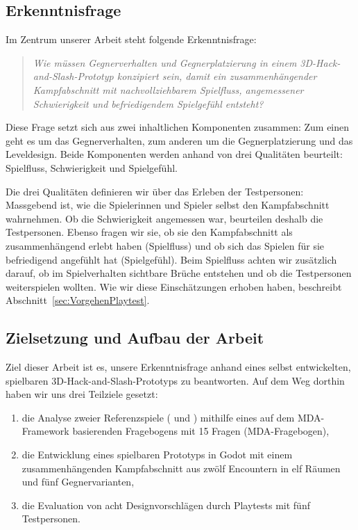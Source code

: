 \documentclass[../Main.tex]{subfiles}
\begin{document}
\subsection{Erkenntnisfrage} \label{sec:Erkenntnisfrage}

Im Zentrum unserer Arbeit steht folgende Erkenntnisfrage:

\vspace{\baselineskip}

\begin{quote}
    \textit{Wie müssen Gegnerverhalten und Gegnerplatzierung in einem 3D-Hack-and-Slash-Prototyp konzipiert sein, damit ein zusammenhängender Kampfabschnitt mit nachvollziehbarem Spielfluss, angemessener Schwierigkeit und befriedigendem Spielgefühl entsteht?}
\end{quote}

\vspace{\baselineskip}

Diese Frage setzt sich aus zwei inhaltlichen Komponenten zusammen: Zum einen geht es um das Gegnerverhalten, zum anderen um die Gegnerplatzierung und das Leveldesign. Beide Komponenten werden anhand von drei Qualitäten beurteilt: Spielfluss, Schwierigkeit und Spielgefühl.

Die drei Qualitäten definieren wir über das Erleben der Testpersonen: Massgebend ist, wie die Spielerinnen und Spieler selbst den Kampfabschnitt wahrnehmen. Ob die Schwierigkeit angemessen war, beurteilen deshalb die Testpersonen. Ebenso fragen wir sie, ob sie den Kampfabschnitt als zusammenhängend erlebt haben (Spielfluss) und ob sich das Spielen für sie befriedigend angefühlt hat (Spielgefühl). Beim Spielfluss achten wir zusätzlich darauf, ob im Spielverhalten sichtbare Brüche entstehen und ob die Testpersonen weiterspielen wollten. Wie wir diese Einschätzungen erhoben haben, beschreibt Abschnitt~\ref{sec:VorgehenPlaytest}.

\subsection{Zielsetzung und Aufbau der Arbeit} \label{sec:Aufbau}

Ziel dieser Arbeit ist es, unsere Erkenntnisfrage anhand eines selbst entwickelten, spielbaren 3D-Hack-and-Slash-Prototyps zu beantworten. Auf dem Weg dorthin haben wir uns drei Teilziele gesetzt:

\begin{enumerate}
    \item die Analyse zweier Referenzspiele ( und ) mithilfe eines auf dem MDA-Framework basierenden Fragebogens mit 15 Fragen (MDA-Fragebogen),
    \item die Entwicklung eines spielbaren Prototyps in Godot mit einem zusammenhängenden Kampfabschnitt aus zwölf Encountern in elf Räumen und fünf Gegnervarianten,
    \item die Evaluation von acht Designvorschlägen durch Playtests mit fünf Testpersonen.
\end{enumerate}
\end{document}
